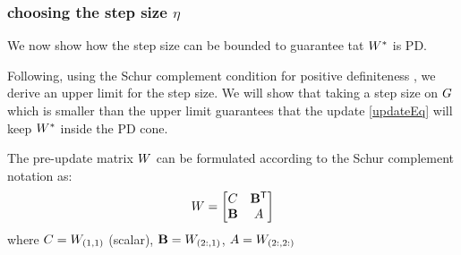 \documentclass{article}
\begin{document}
\subsubsection{choosing the step size $\eta$}
We now show how the step size can be bounded to guarantee tat ${{W^*}}$ is PD.


Following, using the Schur complement condition for positive definiteness , we derive an upper limit for the step size. We will show that taking a step size on ${G}$ which is smaller than the upper limit guarantees that the update \eqref{updateEq} will keep ${{W^*}}$ inside the PD cone. 

The pre-update matrix ${W}$ can be formulated according to the Schur complement notation as: 
\begin{equation}
{W}= \left[ \begin{matrix} C & \mathbf{B{}^\mathsf{T}} \\ \mathbf{B} & {A} \end{matrix} \right]
\label{schurNotationPreUpdate}
\end{equation}
where $C = {W}_{(1,1)}$ (scalar), $\mathbf{B} = {W}_{(2:,1)}$, ${A} = {W}_{(2:,2:)}$
\end{document}

